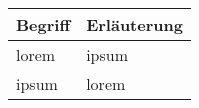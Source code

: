 
\begin{table}[ht]
    \begin{tabularx}{\textwidth}{l X}
        \toprule
        Begriff & Erläuterung \\
        \midrule
        lorem & ipsum \\
        ipsum & lorem \\
        \bottomrule
    \end{tabularx}
\end{table}
